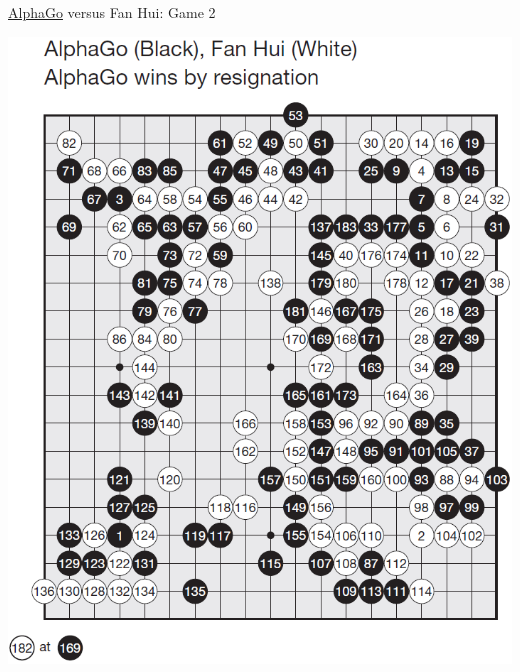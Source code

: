 \documentclass{beamer}
\begin{document}
{    \begin{frame}{{\color{black}\underline{AlphaGo}} versus {\color{white}Fan Hui}: Game 2}
      \begin{center}
        \includegraphics[height=.9\textheight]{../img/AlphaGo_vs_Fan_Hui_Game_2.png}
      \end{center}
    \end{frame}

}
\end{document}
